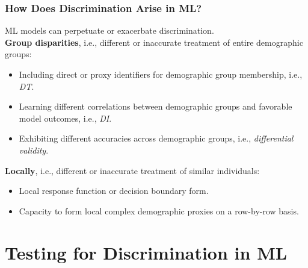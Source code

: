 \documentclass[11pt,aspectratio=169,hyperref={colorlinks}]{beamer}
\begin{document}
		\begin{frame}				
		
			\frametitle{How Does Discrimination Arise in ML?}
			
			ML models can perpetuate or exacerbate discrimination.\\
			\vspace{10pt}
			\noindent \textbf{Group disparities}, i.e., different or inaccurate treatment of entire demographic groups:\\
			\begin{itemize}
				\item Including direct or proxy identifiers for demographic group membership, i.e., \textit{DT}.
				\item Learning different correlations between demographic groups and favorable model outcomes, i.e., \textit{DI}.
				\item Exhibiting different accuracies across demographic groups, i.e., \textit{differential validity}.
			\end{itemize}
			\vspace{5pt}
			\noindent \textbf{Locally}, i.e., different or inaccurate treatment of similar individuals:\\
			\begin{itemize}
				\item Local response function or decision boundary form. 
				\item Capacity to form local complex demographic proxies on a row-by-row basis.
			\end{itemize}
							
		\end{frame}

	\section{Testing for Discrimination in ML}
\end{document}
